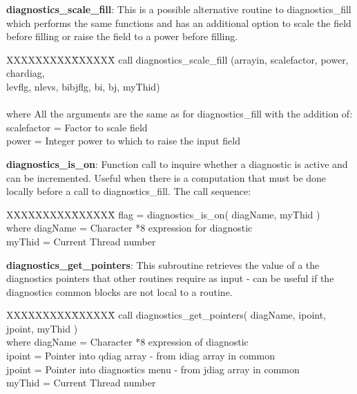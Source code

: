 \noindent
{\bf diagnostics\_scale\_fill}:  This is a possible alternative routine to
diagnostics\_fill which performs the same functions and has an additional option
to scale the field before filling or raise the field to a power before filling.

\noindent
\begin{tabbing}
XXXXXXXXX\=XXXXXX\= \kill
\>        call diagnostics\_scale\_fill (arrayin, scalefactor, power, chardiag, \\
\>        levflg, nlevs, bibjflg, bi, bj, myThid) \\
\\
where \>  All the arguments are the same as for diagnostics\_fill with the addition of: \\
      \>  scalefactor \>= Factor to scale field \\
      \>  power       \>= Integer power to which to raise the input field \\
\end{tabbing}

\noindent
{\bf diagnostics\_is\_on}: Function call to inquire whether a diagnostic is active
and can be incremented. Useful when there is a computation that must be done locally
before a call to diagnostics\_fill. The call sequence:

\noindent
\begin{tabbing}
XXXXXXXXX\=XXXXXX\= \kill
\> flag = diagnostics\_is\_on( diagName, myThid )
\\
where \>  diagName \>= Character *8 expression for diagnostic \\
      \>  myThid   \>= Current Thread number \\
\end{tabbing}

\noindent
{\bf diagnostics\_get\_pointers}:  This subroutine retrieves the value of a the diagnostics
pointers that other routines require as input - can be useful if the diagnostics common
blocks are not local to a routine.

\noindent
\begin{tabbing}
XXXXXXXXX\=XXXXXX\= \kill
\> call diagnostics\_get\_pointers( diagName, ipoint, jpoint, myThid )
\\
where \>  diagName \>= Character *8 expression of diagnostic \\
      \>  ipoint   \>= Pointer into qdiag array - from idiag array in common \\
      \>  jpoint   \>= Pointer into diagnostics menu - from jdiag array in common \\
      \>  myThid   \>= Current Thread number \\
\end{tabbing}

